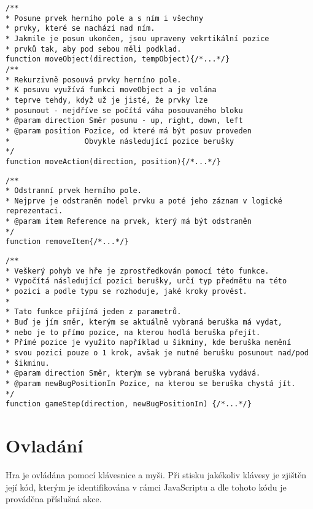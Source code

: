 \begin{lstlisting}[caption=Funkce pro posun objektů,label=code:logicMove]
/**
* Posune prvek herního pole a s ním i všechny
* prvky, které se nachází nad ním.
* Jakmile je posun ukončen, jsou upraveny vekrtikální pozice
* prvků tak, aby pod sebou měli podklad.   
function moveObject(direction, tempObject){/*...*/}
/**
* Rekurzivně posouvá prvky herníno pole.
* K posuvu využívá funkci moveObject a je volána
* teprve tehdy, když už je jisté, že prvky lze
* posunout - nejdříve se počítá váha posouvaného bloku
* @param direction Směr posunu - up, right, down, left
* @param position Pozice, od které má být posuv proveden
*                 Obvykle následující pozice berušky
*/ 
function moveAction(direction, position){/*...*/}
\end{lstlisting}

\begin{lstlisting}[caption=Funkce pro odstraňování objektů,label=code:logicRemove]
/**
* Odstranní prvek herního pole.
* Nejprve je odstraněn model prvku a poté jeho záznam v logické reprezentaci.
* @param item Reference na prvek, který má být odstraněn
*/
function removeItem{/*...*/}
\end{lstlisting}

\begin{lstlisting}[caption=Funkce herního kroku gameStep,label=code:logicGameStep]
/**
* Veškerý pohyb ve hře je zprostředkován pomocí této funkce.
* Vypočítá následující pozici berušky, určí typ předmětu na této
* pozici a podle typu se rozhoduje, jaké kroky provést.
*
* Tato funkce přijímá jeden z parametrů.
* Buď je jím směr, kterým se aktuálně vybraná beruška má vydat,
* nebo je to přímo pozice, na kterou hodlá beruška přejít.
* Přímé pozice je využito například u šikminy, kde beruška nemění
* svou pozici pouze o 1 krok, avšak je nutné berušku posunout nad/pod
* šikminu. 
* @param direction Směr, kterým se vybraná beruška vydává.
* @param newBugPositionIn Pozice, na kterou se beruška chystá jít.
*/
function gameStep(direction, newBugPositionIn) {/*...*/}
\end{lstlisting}
\pagebreak
\section{Ovladání}
Hra je ovládána pomocí klávesnice a myši. Při stisku jakékoliv klávesy je zjištěn její kód, kterým je identifikována v rámci JavaScriptu a dle tohoto kódu je prováděna příslušná akce.

